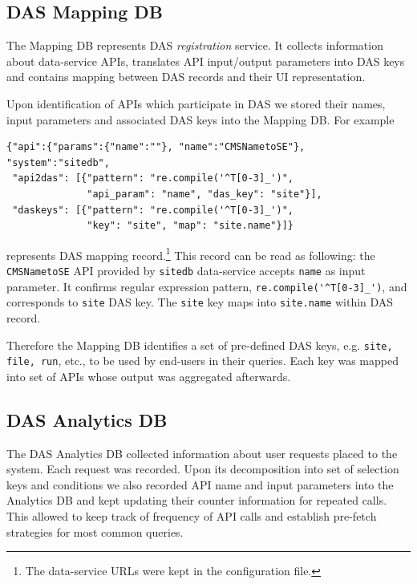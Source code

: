 \documentclass[1p,times]{elsarticle}
\begin{document}
\subsection{DAS Mapping DB}
The Mapping DB represents DAS {\it registration} service. It collects
information about data-service APIs, translates API input/output
parameters into DAS keys and contains mapping between DAS records
and their UI representation.

Upon identification of APIs which participate in DAS 
we stored their names, input parameters and associated DAS keys
into the Mapping DB. For example
\begin{verbatim}
{"api":{"params":{"name":""}, "name":"CMSNametoSE"}, "system":"sitedb",
 "api2das": [{"pattern": "re.compile('^T[0-3]_')", 
              "api_param": "name", "das_key": "site"}], 
 "daskeys": [{"pattern": "re.compile('^T[0-3]_')", 
              "key": "site", "map": "site.name"}]}
\end{verbatim}
represents DAS mapping record.\footnote{
The data-service URLs were kept in the configuration file.
}
This record can be read as following:
the \verb+CMSNametoSE+ API provided by 
\verb+sitedb+ data-service accepts \verb+name+ as input parameter. It
confirms regular expression pattern, \verb+re.compile('^T[0-3]_')+, and
corresponds to \verb+site+ DAS key. The \verb+site+ key
maps into \verb+site.name+ within DAS record. 

Therefore the Mapping DB identifies a set of pre-defined DAS keys, 
e.g. \verb+site, file, run+, etc., to be used by end-users in their queries.
Each key was mapped into set of APIs whose output was aggregated afterwards. 

\subsection{DAS Analytics DB}
The DAS Analytics DB collected information
about user requests placed to the system. Each request was recorded. Upon its
decomposition into set of selection keys and conditions we also recorded
API name and input parameters into the Analytics DB and 
kept updating their counter information for repeated calls. 
This allowed to keep track of frequency of API calls and establish 
pre-fetch strategies for most common queries.
\end{document}
